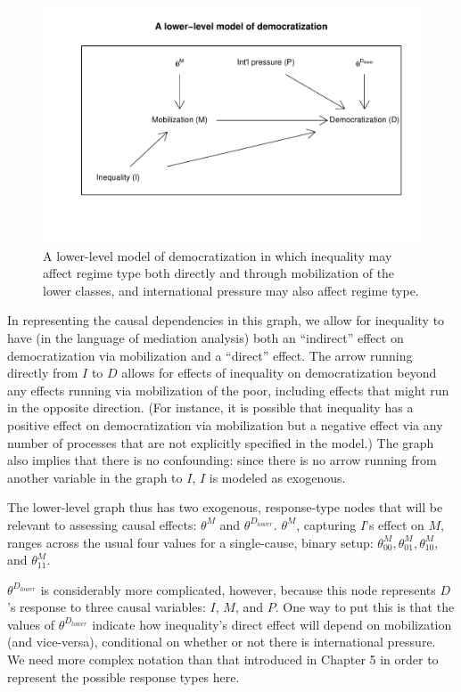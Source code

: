 \documentclass[
  12pt,
]{book}
\begin{document}
\begin{figure}

{\centering \includegraphics[width=.7\textwidth]{ii_files/figure-latex/lowdem-1} 

}

\caption{A lower-level model of democratization in which inequality may affect regime type both directly and through mobilization of the lower classes, and international pressure may also affect regime type.}\label{fig:lowdem}
\end{figure}

In representing the causal dependencies in this graph, we allow for inequality to have (in the language of mediation analysis) both an ``indirect'' effect on democratization via mobilization and a ``direct'' effect. The arrow running directly from \(I\) to \(D\) allows for effects of inequality on democratization beyond any effects running via mobilization of the poor, including effects that might run in the opposite direction. (For instance, it is possible that inequality has a positive effect on democratization via mobilization but a negative effect via any number of processes that are not explicitly specified in the model.) The graph also implies that there is no confounding: since there is no arrow running from another variable in the graph to \(I\), \(I\) is modeled as exogenous.

The lower-level graph thus has two exogenous, response-type nodes that will be relevant to assessing causal effects: \(\theta^M\) and \(\theta^{D_{lower}}\). \(\theta^M\), capturing \(I\)'s effect on \(M\), ranges across the usual four values for a single-cause, binary setup: \(\theta_{00}^M, \theta_{01}^M, \theta_{10}^M\), and \(\theta_{11}^M\).

\(\theta^{D_{lower}}\) is considerably more complicated, however, because this node represents \(D\)'s response to three causal variables: \(I\), \(M\), and \(P\). One way to put this is that the values of \(\theta^{D_{lower}}\) indicate how inequality's direct effect will depend on mobilization (and vice-versa), conditional on whether or not there is international pressure. We need more complex notation than that introduced in Chapter 5 in order to represent the possible response types here.
\end{document}
